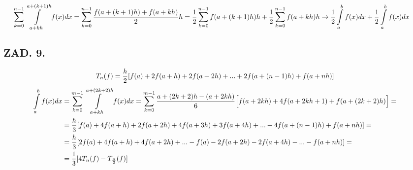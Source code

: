 \documentclass{article}[16pt]
\begin{document}
\begin{align*}
    \sum\limits_{k=0}^{n-1}\int\limits_{a+kh}^{a+(k+1)h}f(x)dx&=\sum\limits_{k=0}^{n-1}{f(a+(k+1)h)+f(a+kh)\over 2}h=\frac12\sum\limits_{k=0}^{n-1}f(a+(k+1)h)h+\frac12\sum\limits_{k=0}^{n-1}f(a+kh)h\to\frac12\int\limits_a^bf(x)dx+\frac12\int\limits_a^bf(x)dx
\end{align*}

\subsection*{ZAD. 9.}

$$T_n(f)={h\over 2}[f(a)+2f(a+h)+2f(a+2h)+...+2f(a+(n-1)h)+f(a+nh)]$$
\begin{align*}
    \int\limits_a^bf(x)dx&=\sum\limits_{k=0}^{m-1}\int\limits_{a+kh}^{a+(2k+2)h}f(x)dx=\sum\limits_{k=0}^{m-1}{a+(2k+2)h-(a+2kh)\over6}\Big[f(a+2kh)+4f(a+2kh+1)+f(a+(2k+2)h)\Big]=\\
    &={h\over3}[f(a)+4f(a+h)+2f(a+2h)+4f(a+3h)+3f(a+4h)+...+4f(a+(n-1)h)+f(a+nh)]=\\
    &={h\over3}[2f(a)+4f(a+h)+4f(a+2h)+...-f(a)-2f(a+2h)-2f(a+4h)-...-f(a+nh)]=\\
    &=\frac13[4T_n(f)-T_{\frac n2}(f)]
\end{align*}
\end{document}
